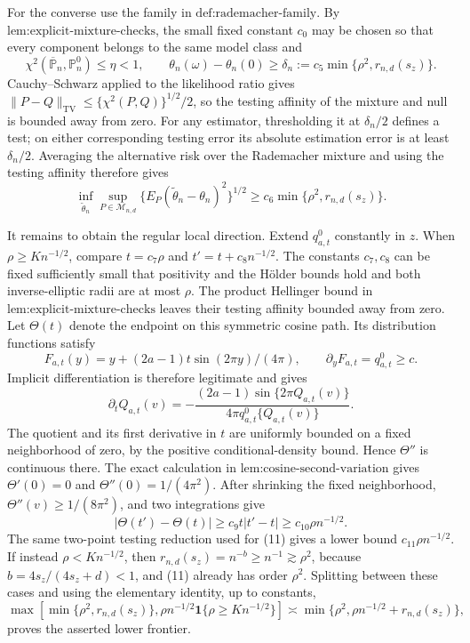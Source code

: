 For the converse use the family in \(\text{def:rademacher-family}\).  By \(\text{lem:explicit-mixture-checks}\), the small fixed constant \(c_0\) may be chosen so that every component belongs to the same model class and
\[
\chi^2(\overline{\mathbb P}_n,\mathbb P_n^0)\le\eta<1,
\qquad
\theta_n(\omega)-\theta_n(0)\ge
\delta_n:=c_5\min\{\rho^2,r_{n,d}(s_z)\}. \tag{10}
\]
Cauchy--Schwarz applied to the likelihood ratio gives
\(\|P-Q\|_{\mathrm{TV}}\le\{\chi^2(P,Q)\}^{1/2}/2\), so the testing affinity of the mixture and null is bounded away from zero.  For any estimator, thresholding it at \(\delta_n/2\) defines a test; on either corresponding testing error its absolute estimation error is at least \(\delta_n/2\).  Averaging the alternative risk over the Rademacher mixture and using the testing affinity therefore gives
\[
\inf_{\widetilde\theta_n}\sup_{P\in\mathcal M_{n,d}}
\{E_P(\widetilde\theta_n-\theta_n)^2\}^{1/2}
\ge c_6\min\{\rho^2,r_{n,d}(s_z)\}. \tag{11}
\]

It remains to obtain the regular local direction.  Extend \(q_{a,t}^{0}\) constantly in \(z\).  When \(\rho\ge K n^{-1/2}\), compare \(t=c_7\rho\) and \(t'=t+c_8n^{-1/2}\).  The constants \(c_7,c_8\) can be fixed sufficiently small that positivity and the H\"older bounds hold and both inverse-elliptic radii are at most \(\rho\).  The product Hellinger bound in \(\text{lem:explicit-mixture-checks}\) leaves their testing affinity bounded away from zero.  Let \(\Theta(t)\) denote the endpoint on this symmetric cosine path.  Its distribution functions satisfy
\[
F_{a,t}(y)=y+(2a-1)t\sin(2\pi y)/(4\pi),
\qquad \partial_yF_{a,t}=q_{a,t}^{0}\ge c.
\]
Implicit differentiation is therefore legitimate and gives
\[
\partial_tQ_{a,t}(v)
=-\frac{(2a-1)\sin\{2\pi Q_{a,t}(v)\}}
{4\pi q_{a,t}^{0}\{Q_{a,t}(v)\}}.
\]
The quotient and its first derivative in \(t\) are uniformly bounded on a fixed neighborhood of zero, by the positive conditional-density bound.  Hence \(\Theta''\) is continuous there.  The exact calculation in \(\text{lem:cosine-second-variation}\) gives \(\Theta'(0)=0\) and \(\Theta''(0)=1/(4\pi^2)\).  After shrinking the fixed neighborhood, \(\Theta''(v)\ge1/(8\pi^2)\), and two integrations give
\[
|\Theta(t')-\Theta(t)|\ge c_9t|t'-t|\ge c_{10}\rho n^{-1/2}. \tag{12}
\]
The same two-point testing reduction used for (11) gives a lower bound \(c_{11}\rho n^{-1/2}\).  If instead \(\rho<K n^{-1/2}\), then \(r_{n,d}(s_z)=n^{-b}\ge n^{-1}\gtrsim\rho^2\), because \(b=4s_z/(4s_z+d)<1\), and (11) already has order \(\rho^2\).  Splitting between these cases and using the elementary identity, up to constants,
\[
\max\!\left[\min\{\rho^2,r_{n,d}(s_z)\},
\rho n^{-1/2}\mathbf 1\{\rho\ge K n^{-1/2}\}\right]
\asymp\min\{\rho^2,\rho n^{-1/2}+r_{n,d}(s_z)\}, \tag{13}
\]
proves the asserted lower frontier.

